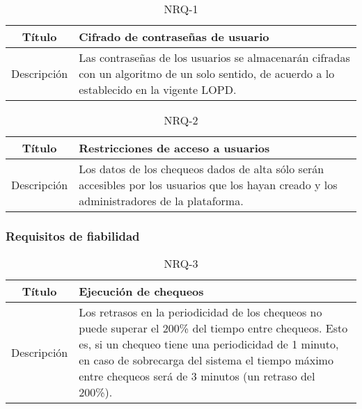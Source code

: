 \begin{table}[h!]
  \centering
  \begin{tabularx}{\textwidth}{|c|X|}
    \hline
    Título & Cifrado de contraseñas de usuario \\

    \hline

    Descripción & Las contraseñas de los usuarios se almacenarán cifradas con un
    algoritmo de un solo sentido, de acuerdo a lo establecido en la vigente \ac{LOPD}. \\


    \hline
  \end{tabularx}
  \caption{NRQ-1}
\end{table}

\begin{table}[h!]
  \centering
  \begin{tabularx}{\textwidth}{|c|X|}
    \hline
    Título & Restricciones de acceso a usuarios \\

    \hline

    Descripción & Los datos de los chequeos dados de alta sólo serán accesibles
    por los usuarios que los hayan creado y los administradores de la plataforma. \\


    \hline
  \end{tabularx}
  \caption{NRQ-2}
\end{table}

\FloatBarrier
\subsubsection{Requisitos de fiabilidad}


\begin{table}[h!]
  \centering
  \begin{tabularx}{\textwidth}{|c|X|}
    \hline
    Título & Ejecución de chequeos \\

    \hline

    Descripción & Los retrasos en la periodicidad de los chequeos no puede
    superar el 200\% del tiempo entre chequeos. Esto es, si un chequeo tiene una
    periodicidad de 1 minuto, en caso de sobrecarga del sistema el tiempo máximo
    entre chequeos será de 3 minutos (un retraso del 200\%). \\

    \hline
  \end{tabularx}
  \caption{NRQ-3}
\end{table}


